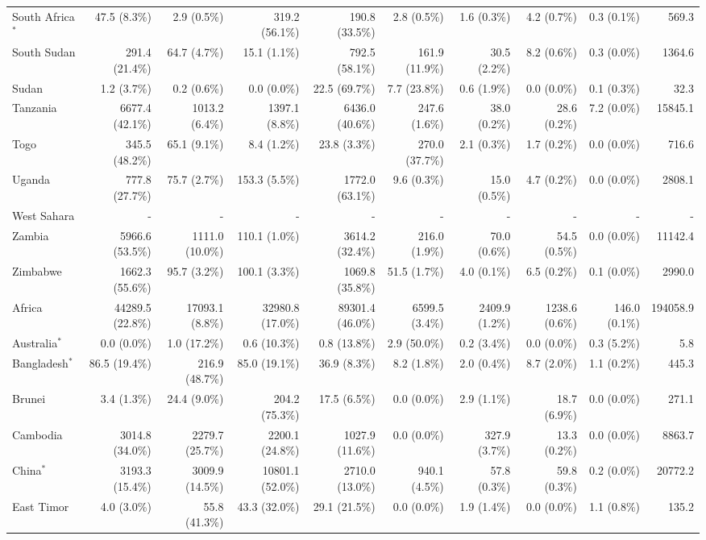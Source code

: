 \begin{scriptsize}
\begin{landscape}
\begin{center}
\begin{longtable}[ht]{lrrrrrrrrr}
			South Africa$^*$&47.5 (8.3\%)&2.9 (0.5\%)&319.2 (56.1\%)&190.8 (33.5\%)&2.8 (0.5\%)&1.6 (0.3\%)&4.2 (0.7\%)&0.3 (0.1\%)&569.3\\
			South Sudan&291.4 (21.4\%)&64.7 (4.7\%)&15.1 (1.1\%)&792.5 (58.1\%)&161.9 (11.9\%)&30.5 (2.2\%)&8.2 (0.6\%)&0.3 (0.0\%)&1364.6\\
			Sudan&1.2 (3.7\%)&0.2 (0.6\%)&0.0 (0.0\%)&22.5 (69.7\%)&7.7 (23.8\%)&0.6 (1.9\%)&0.0 (0.0\%)&0.1 (0.3\%)&32.3\\
			Tanzania&6677.4 (42.1\%)&1013.2 (6.4\%)&1397.1 (8.8\%)&6436.0 (40.6\%)&247.6 (1.6\%)&38.0 (0.2\%)&28.6 (0.2\%)&7.2 (0.0\%)&15845.1\\
			Togo&345.5 (48.2\%)&65.1 (9.1\%)&8.4 (1.2\%)&23.8 (3.3\%)&270.0 (37.7\%)&2.1 (0.3\%)&1.7 (0.2\%)&0.0 (0.0\%)&716.6\\
			Uganda&777.8 (27.7\%)&75.7 (2.7\%)&153.3 (5.5\%)&1772.0 (63.1\%)&9.6 (0.3\%)&15.0 (0.5\%)&4.7 (0.2\%)&0.0 (0.0\%)&2808.1\\
			West Sahara&-&-&-&-&-&-&-&-&-\\
			Zambia&5966.6 (53.5\%)&1111.0 (10.0\%)&110.1 (1.0\%)&3614.2 (32.4\%)&216.0 (1.9\%)&70.0 (0.6\%)&54.5 (0.5\%)&0.0 (0.0\%)&11142.4\\
			Zimbabwe&1662.3 (55.6\%)&95.7 (3.2\%)&100.1 (3.3\%)&1069.8 (35.8\%)&51.5 (1.7\%)&4.0 (0.1\%)&6.5 (0.2\%)&0.1 (0.0\%)&2990.0\\\hline
			Africa&44289.5 (22.8\%)&17093.1 (8.8\%)&32980.8 (17.0\%)&89301.4 (46.0\%)&6599.5 (3.4\%)&2409.9 (1.2\%)&1238.6 (0.6\%)&146.0 (0.1\%)&194058.9\\\hline
			Australia$^*$&0.0 (0.0\%)&1.0 (17.2\%)&0.6 (10.3\%)&0.8 (13.8\%)&2.9 (50.0\%)&0.2 (3.4\%)&0.0 (0.0\%)&0.3 (5.2\%)&5.8\\
			Bangladesh$^*$&86.5 (19.4\%)&216.9 (48.7\%)&85.0 (19.1\%)&36.9 (8.3\%)&8.2 (1.8\%)&2.0 (0.4\%)&8.7 (2.0\%)&1.1 (0.2\%)&445.3\\
			Brunei&3.4 (1.3\%)&24.4 (9.0\%)&204.2 (75.3\%)&17.5 (6.5\%)&0.0 (0.0\%)&2.9 (1.1\%)&18.7 (6.9\%)&0.0 (0.0\%)&271.1\\
			Cambodia&3014.8 (34.0\%)&2279.7 (25.7\%)&2200.1 (24.8\%)&1027.9 (11.6\%)&0.0 (0.0\%)&327.9 (3.7\%)&13.3 (0.2\%)&0.0 (0.0\%)&8863.7\\
			China$^*$&3193.3 (15.4\%)&3009.9 (14.5\%)&10801.1 (52.0\%)&2710.0 (13.0\%)&940.1 (4.5\%)&57.8 (0.3\%)&59.8 (0.3\%)&0.2 (0.0\%)&20772.2\\
			East Timor&4.0 (3.0\%)&55.8 (41.3\%)&43.3 (32.0\%)&29.1 (21.5\%)&0.0 (0.0\%)&1.9 (1.4\%)&0.0 (0.0\%)&1.1 (0.8\%)&135.2\\

\end{longtable}
\end{center}
\end{landscape}
\end{scriptsize}
